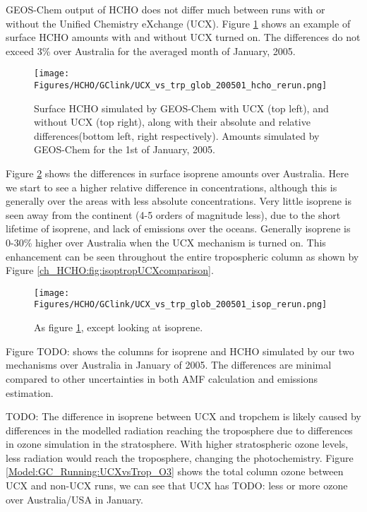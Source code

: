     GEOS-Chem output of HCHO does not differ much between runs with or without the Unified Chemistry eXchange (UCX).
    Figure \ref{Model:GC_Running:UCXvsTrop_HCHO} shows an example of surface HCHO amounts with and without UCX turned on.
    The differences do not exceed 3\% over Australia for the averaged month of January, 2005.
    
    \begin{figure}%
      \texttt{[image: Figures/HCHO/GClink/UCX\_vs\_trp\_glob\_200501\_hcho\_rerun.png]}
      \caption{ %
        Surface HCHO simulated by GEOS-Chem with UCX (top left), and without UCX (top right), along with their absolute and relative differences(bottom left, right respectively).
        Amounts simulated by GEOS-Chem for the 1st of January, 2005.
      }
      \label{Model:GC_Running:UCXvsTrop_HCHO}
    \end{figure}
    
    Figure \ref{Model:GC_Running:UCXvsTrop_Isop} shows the differences in surface isoprene amounts over Australia.
    Here we start to see a higher relative difference in concentrations, although this is generally over the areas with less absolute concentrations. 
    Very little isoprene is seen away from the continent (4-5 orders of magnitude less), due to the short lifetime of isoprene, and lack of emissions over the oceans.
    Generally isoprene is 0-30\% higher over Australia when the UCX mechanism is turned on.
    This enhancement can be seen throughout the entire tropospheric column as shown by Figure \ref{ch_HCHO:fig:isoptropUCXcomparison}.
    \begin{figure}%
      \texttt{[image: Figures/HCHO/GClink/UCX\_vs\_trp\_glob\_200501\_isop\_rerun.png]}
      \caption{ %
        As figure \ref{Model:GC_Running:UCXvsTrop_HCHO}, except looking at isoprene. 
      }      
      \label{Model:GC_Running:UCXvsTrop_Isop}
    \end{figure}
    
    
    Figure TODO: shows the columns for isoprene and HCHO simulated by our two mechanisms over Australia in January of 2005.
    The differences are minimal compared to other uncertainties in both AMF calculation and emissions estimation.
    
    
    TODO: The difference in isoprene between UCX and tropchem is likely caused by differences in the modelled radiation reaching the troposphere due to differences in ozone simulation in the stratosphere.
    With higher stratospheric ozone levels, less radiation would reach the troposphere, changing the photochemistry.
    Figure \ref{Model:GC_Running:UCXvsTrop_O3} shows the total column ozone between UCX and non-UCX runs, we can see that UCX has TODO: less or more ozone over Australia/USA in January.
        
